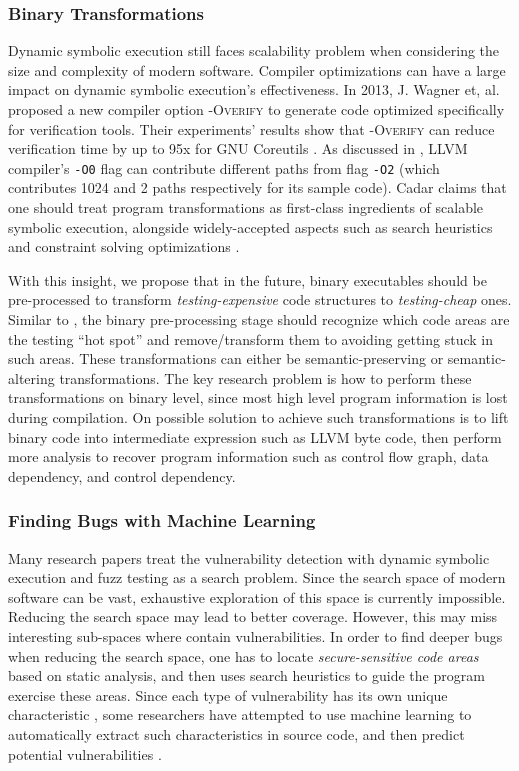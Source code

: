 \subsubsection{Binary Transformations}
Dynamic symbolic execution still faces scalability problem when considering the size and complexity of modern software. 
 Compiler optimizations can have a large impact on dynamic symbolic execution's effectiveness. 
 In 2013, J. Wagner et, al. proposed a new compiler option \textsc{-Overify} to generate code optimized specifically for verification tools.
  Their experiments' results show that \textsc{-Overify} can reduce verification time by up to 95x for GNU Coreutils \cite{wagner2013overify}.
 As discussed in \cite{Cadar:2015:TPT}, LLVM compiler's \texttt{-O0} flag can contribute different paths from flag \texttt{-O2} (which contributes 1024 and 2 paths respectively for its sample code).
 Cadar claims that one should treat program transformations as first-class ingredients of scalable symbolic execution, alongside widely-accepted aspects such as search heuristics and constraint solving optimizations \cite{Cadar:2015:TPT}. 
 
With this insight, we propose that in the future, binary executables should be pre-processed to transform \textit{testing-expensive} code structures to \textit{testing-cheap} ones.
  Similar to \cite{wagner2015high}, the binary pre-processing stage should recognize which code areas are the testing ``hot spot'' and remove/transform them to avoiding getting stuck in such areas.
  These transformations can either be semantic-preserving or semantic-altering transformations. 
 The key research problem is how to perform these transformations on binary level, since most high level program information is lost during compilation. 
 On possible solution to achieve such transformations is to lift binary code into intermediate expression such as LLVM byte code, then perform more analysis to recover program information such as control flow graph, data dependency, and control dependency. 

\subsubsection{Finding Bugs with Machine Learning}
Many research papers treat the vulnerability detection with dynamic symbolic execution and fuzz testing as a search problem.
 Since the search space of modern software can be vast, exhaustive exploration of this space is currently impossible.
 Reducing the search space may lead to better coverage.
 However, this may miss interesting sub-spaces where contain vulnerabilities. 
 In order to find deeper bugs when reducing the search space, one has to locate \textit{secure-sensitive code areas} based on static analysis, and then uses search heuristics to guide the program exercise these areas.
 Since each type of vulnerability has its own unique characteristic \cite{MBishop:ATBOC, wang2009intscope, wang2010ricb}, 
 some researchers have attempted to use machine learning to automatically extract such characteristics in source code, and then predict potential vulnerabilities \cite{VCCFinder, Yamaguchi:2011:VEA}.

